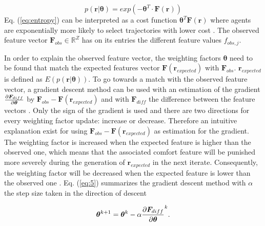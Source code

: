 \begin{equation}\label{eq:entropy}
	p(\bm{r}|\bm{\theta}) = exp(-\bm{\theta}^T\cdot \bm{F}(\bm{r}))
\end{equation}
Eq. (\ref{eq:entropy}) can be interpreted as a cost function $\bm{\theta}^T\bm{F}(\bm{r})$ where agents are exponentially more likely to select trajectories with lower cost \cite{Kuderer2015a}.
The observed feature vector $\bm{F}_{obs} \in \mathbb{R}^Z$ has on its entries the different feature values $f_{obs,j}$. 


In order to explain the observed feature vector, the weighting factors $\bm{\theta}$ need to be found that match the expected features vector $\bm{F}(\bm{r}_{expected})$ with $\bm{F}_{obs}$. $\bm{r}_{expected}$ is defined as $ E(p(\bm{r}|\bm{\theta}))$. To go towards a match with the observed feature vector, a gradient descent method can be used with an estimation of the gradient $\pdv{\bm{F}_{diff}}{\bm{\theta}}$ by $\bm{F}_{obs} - \bm{F}(\bm{r}_{expected})$ and with $\bm{F}_{diff}$ the difference between the feature vectors \cite{Ziebart2008, Kretzschmar2014}. Only the sign of the gradient is used and there are two directions for every weighting factor update: increase or decrease. Therefore an intuitive explanation exist for using $\bm{F}_{obs} - \bm{F}(\bm{r}_{expected})$ as estimation for the gradient. The weighting factor is increased when the expected feature is higher than the observed one, which means that the associated comfort feature will be punished more severely during the generation of $\bm{r}_{expected}$ in the next iterate. Consequently, the weighting factor will be decreased when the expected feature is lower than the observed one \cite{Kuderer2015a}. Eq. (\ref{eq:5}) summarizes the gradient descent method with $\alpha$ the step size taken in the direction of descent

\begin{equation}\label{eq:5}
	\bm{\theta}^{k+1} = \bm{\theta}^{k} - \alpha \pdv{\bm{F}_{diff}}{\bm{\theta}}^k .
\end{equation}

